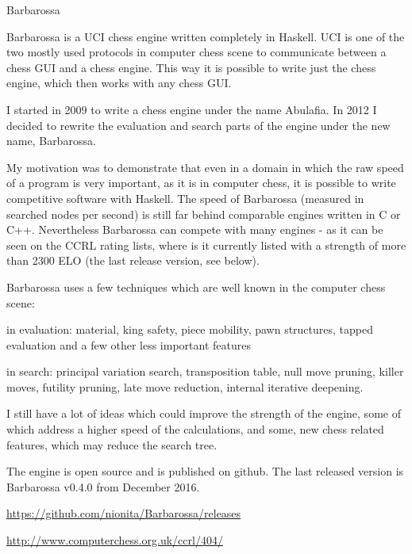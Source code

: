 \begin{hcarentry}[updated]{Barbarossa}
\makeheader

Barbarossa is a UCI chess engine written completely in Haskell. UCI is one of
the two mostly used protocols in computer chess scene to communicate between a
chess GUI and a chess engine. This way it is possible to write just the chess engine,
which then works with any chess GUI.

I started in 2009 to write a chess engine under the name Abulafia. In 2012 I
decided to rewrite the evaluation and search parts of the engine under the new
name, Barbarossa.

My motivation was to demonstrate that even in a domain in which the raw speed
of a program is very important, as it is in computer chess, it is possible to
write competitive software with Haskell. The speed of Barbarossa (measured in
searched nodes per second) is still far behind comparable engines written in C
or C++. Nevertheless Barbarossa can compete with many engines - as it can be
seen on the CCRL rating lists, where is it currently listed with a strength
of more than 2300 ELO (the last release version, see below).

Barbarossa uses a few techniques which are well known in the computer chess scene:
\begin{compactitem}
\item in evaluation: material, king safety, piece mobility, pawn structures,
tapped evaluation and a few other less important features
\item in search: principal variation search, transposition table, null move
pruning, killer moves, futility pruning, late move reduction, internal
iterative deepening.
\end{compactitem}

I still have a lot of ideas which could improve the strength of the engine,
some of which address a higher speed of the calculations, and some, new chess
related features, which may reduce the search tree.

The engine is open source and is published on github. The last released version
is Barbarossa v0.4.0 from December 2016.

\FurtherReading
\begin{compactitem}
\item\url{https://github.com/nionita/Barbarossa/releases}
\item\url{http://www.computerchess.org.uk/ccrl/404/}
\end{compactitem}
\end{hcarentry}
